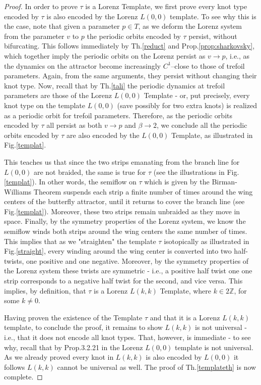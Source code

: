 \documentclass[10pt,reqno]{amsart}
\theoremstyle{plain}
\theoremstyle{assumption}
\theoremstyle{notation}
\theoremstyle{claim}
\theoremstyle{conj}
\theoremstyle{theorem}
\theoremstyle{proposition}
\theoremstyle{corollary}
\begin{document}
\begin{proof}
In order to prove $\tau$ is a Lorenz Template, we first prove every knot type encoded by $\tau$ is also encoded by the Lorenz $L(0,0)$ template. To see why this is the case, note that given a parameter $p\in T$, as we deform the Lorenz system from the parameter $v$ to $p$ the periodic orbits encoded by $\tau$ persist, without bifurcating. This follows immediately by Th.\ref{reduct} and Prop.\ref{prop:sharkovsky}, which together imply the periodic orbits on the Lorenz persist as $v\to p$, i.e., as the dynamics on the attractor become increasingly $C^1$--close to those of trefoil parameters. Again, from the same arguments, they persist without changing their knot type. Now, recall that by Th.\ref{tali} the periodic dynamics at trefoil parameters are those of the Lorenz $L(0,0)$ Template - or, put precisely, every knot type on the template $L(0,0)$ (save possibly for two extra knots) is realized as a periodic orbit for trefoil parameters. Therefore, as the periodic orbits encoded by $\tau$ all persist as both $v\to p$ and $\beta\to2$, we conclude all the periodic orbits encoded by $\tau$ are also encoded by the $L(0,0)$ Template, as illustrated in Fig.\ref{templat}.

This teaches us that since the two strips emanating from the branch line for $L(0,0)$ are not braided, the same is true for $\tau$ (see the illustrations in Fig.\ref{templat}). In other words, the semiflow on $\tau$ which is given by the Birman-Williams Theorem suspends each strip a finite number of times around the wing centers of the butterfly attractor, until it returns to cover the branch line (see Fig.\ref{templat}). Moreover, these two strips remain unbraided as they move in space. Finally, by the symmetry properties of the Lorenz system, we know the semiflow winds both strips around the wing centers the same number of times. This implies that as we "straighten" the template $\tau$ isotopically as illustrated in Fig.\ref{straight}, every winding around the wing center is converted into two half-twists, one positive and one negative. Moreover, by the symmetry properties of the Lorenz system these twists are symmetric - i.e., a positive half twist one one strip corresponds to a negative half twist for the second, and vice versa. This implies, by definition, that $\tau$ is a Lorenz $L(k,k)$ Template, where $k\in 2\mathbb{Z}$, for some $k\ne0$.

Having proven the existence of the Template $\tau$ and that it is a Lorenz $L(k,k)$ template, to conclude the proof, it remains to show $L(k,k)$ is not universal - i.e., that it does not encode all knot types. That, however, is immediate - to see why, recall that by Prop.3.2.21 in \cite{KNOTBOOK} the Lorenz $L(0,0)$ template is not universal. As we already proved every knot in $L(k,k)$ is also encoded by $L(0,0)$ it follows $L(k,k)$ cannot be universal as well. The proof of Th.\ref{templateth} is now complete.
\end{proof}
\end{document}

